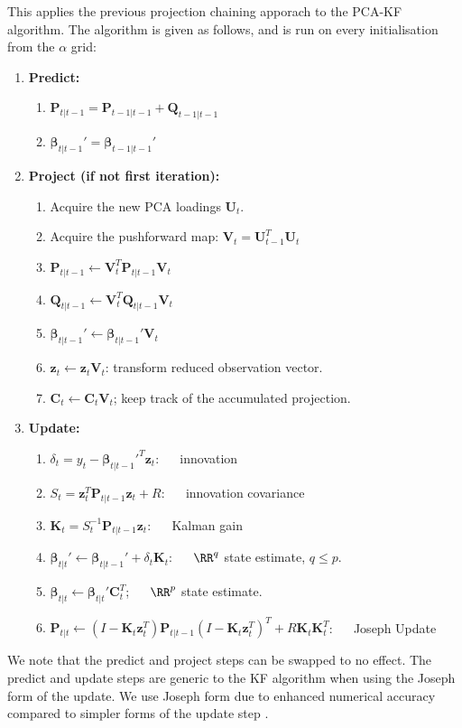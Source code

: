 This applies the previous projection chaining apporach to the PCA-KF algorithm. The algorithm is given as follows, and is run on every initialisation from the $\alpha$ grid:
\begin{enumerate}
    \item \textbf{Predict:}
    \begin{enumerate}
        \item $\bm{P}_{t|t-1} = \bm{P}_{t-1|t-1}+\bm{Q}_{t-1|t-1}$
        \item $\bm{\beta}_{t|t-1}' = \bm{\beta}_{t-1|t-1}'$
    \end{enumerate}
    \item \textbf{Project (if not first iteration):}
    \begin{enumerate}
        \item Acquire the new PCA loadings $\bm{U}_t$.
        \item Acquire the pushforward map: $\bm{V}_t=\bm{U}_{t-1}^T\bm{U}_t$
        \item $\bm{P}_{t|t-1}\leftarrow \bm{V}_t^T\bm{P}_{t|t-1}\bm{V}_t$
        \item $\bm{Q}_{t|t-1}\leftarrow \bm{V}_t^T\bm{Q}_{t|t-1}\bm{V}_t$
        \item $\bm{\beta}_{t|t-1}' \leftarrow \bm{\beta}_{t|t-1}'\bm{V}_t$
        \item $\bm{z}_t\leftarrow \bm{z}_{t}\bm{V}_t$: transform reduced observation vector.
        \item $\bm{C}_t \leftarrow \bm{C}_t \bm{V}_t$; keep track of the accumulated projection.
    \end{enumerate}
    \item \textbf{Update:}
    \begin{enumerate}
        \item $\delta_t=y_t-\bm{\beta}_{t|t-1}'^T\bm{z}_t$: $\quad$ innovation
        \item $S_t= \bm{z}_t^T \bm{P}_{t|t-1}\bm{z}_t + R$: $\quad$ innovation covariance
        \item $\bm{K}_t = S_t^{-1}\bm{P}_{t|t-1}\bm{z}_t$: $\quad$ Kalman gain
        \item $\bm{\beta}_{t|t}' \leftarrow \bm{\beta}_{t|t-1}' + \delta_t\bm{K}_t$: $\quad$ $\RR^q$ state estimate, $q\le p$.
        \item $\bm{\beta}_{t|t} \leftarrow \bm{\beta}_{t|t}' \bm{C}_t^T$;  $\quad$ $\RR^p$ state estimate.
        \item $\bm{P}_{t|t} \leftarrow (I-\bm{K}_t \bm{z}_t^T)\bm{P}_{t|t-1}(I-\bm{K}_t \bm{z}_t^T)^T+R\bm{K}_t\bm{K}_t^T$: $\quad$ Joseph Update
    \end{enumerate}
\end{enumerate} 
We note that the predict and project steps can be swapped to no effect. The predict and update steps are generic to the KF algorithm when using the Joseph form of the update. We use Joseph form due to enhanced numerical accuracy compared to simpler forms of the update step \cite{Zanetti_DeMars_2013}. 

